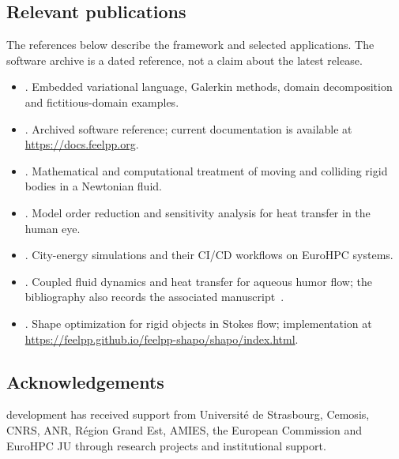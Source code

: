 \subsection{Relevant publications}
\label{sec:Feelpp:publications}
The references below describe the framework and selected applications. The
software archive is a dated reference, not a claim about the latest release.
\begin{itemize}
  \item {}. Embedded variational language,
    Galerkin methods, domain decomposition and fictitious-domain examples.
  \item {}. Archived software reference;
    current documentation is available at \url{https://docs.feelpp.org}.
  \item {}. Mathematical and
    computational treatment of moving and colliding rigid bodies in a Newtonian fluid.
  \item {}. Model order reduction and sensitivity
    analysis for heat transfer in the human eye.
  \item {}. City-energy simulations and their
    CI/CD workflows on EuroHPC systems.
  \item {}. Coupled fluid dynamics and
    heat transfer for aqueous humor flow; the bibliography also records the
    associated manuscript~\cite{saigre_coupled_2024_paper}.
  \item {}. Shape optimization for rigid objects
    in Stokes flow; implementation at
    \url{https://feelpp.github.io/feelpp-shapo/shapo/index.html}.
\end{itemize}

\subsection{Acknowledgements}
\label{sec::Feelpp:acknowledgements}
\Feelpp development has received support from Universit\'e de Strasbourg,
Cemosis, CNRS, ANR, R\'egion Grand Est, AMIES, the European Commission and
EuroHPC JU through research projects and institutional support.
\endgroup
